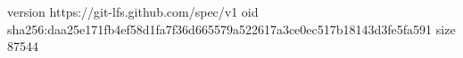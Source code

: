 version https://git-lfs.github.com/spec/v1
oid sha256:daa25e171fb4ef58d1fa7f36d665579a522617a3ce0ec517b18143d3fe5fa591
size 87544
